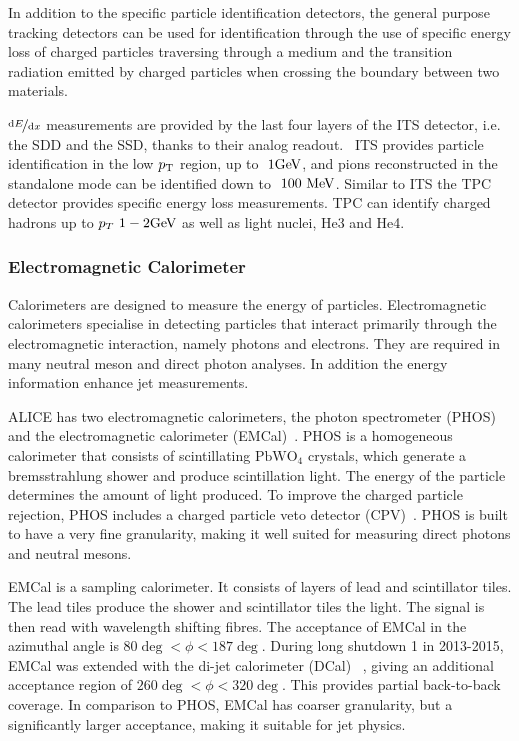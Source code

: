 In addition to the specific particle identification detectors, the general purpose tracking detectors can be used for identification through the use of specific energy loss of charged particles traversing through a medium and the transition radiation emitted by charged particles when crossing the boundary between two materials. 

$\nicefrac{\mathrm{d}E}{\mathrm{d}x}$ measurements are provided by the last four layers of the ITS detector, i.e. the SDD and the SSD, thanks to their analog readout.~\cite{ALICEpid} ITS provides particle identification in the low $p_{\rm T}$ region, up to $~ 1 \mathrm{GeV}\kern-0.05em$, and pions reconstructed in the standalone mode can be identified down to $~100 \mbox{~MeV}$. Similar to ITS the TPC detector provides specific energy loss measurements. TPC can identify charged hadrons up to $p_T ~ 1-2 \mathrm{GeV}\kern-0.05em$ as well as light nuclei, He3 and He4.


\subsubsection{Electromagnetic Calorimeter}
Calorimeters are designed to measure the energy of particles. Electromagnetic calorimeters specialise in detecting particles that interact primarily through the electromagnetic interaction, namely photons and electrons. They are required in many neutral meson and direct photon analyses. In addition the energy information enhance jet measurements.

ALICE has two electromagnetic calorimeters, the photon spectrometer (PHOS)~\cite{PHOS} and the electromagnetic calorimeter (EMCal)~\cite{emcal}. PHOS is a homogeneous calorimeter that consists of scintillating $\mathrm{PbWO_4}$ crystals, which generate a bremsstrahlung  shower and produce scintillation light. The energy of the particle determines the amount of light produced. To improve the charged particle rejection, PHOS includes a charged particle veto detector (CPV)~\cite{cpv}. PHOS is built to have a very fine granularity, making it well suited for measuring direct photons and neutral mesons.

EMCal is a sampling calorimeter. It consists of layers of lead and scintillator tiles. The lead tiles produce the shower and scintillator tiles the light. The signal is then read with wavelength shifting fibres. The acceptance of EMCal in the azimuthal angle is $ 80\deg < \phi < 187 \deg$. During long shutdown 1 in 2013-2015, EMCal was extended with the di-jet calorimeter (DCal) ~\cite{DCAL}, giving an additional acceptance region of $ 260\deg < \phi < 320 \deg$. This provides partial back-to-back coverage. In comparison to PHOS, EMCal has coarser granularity, but a significantly larger acceptance, making it suitable for jet physics.

